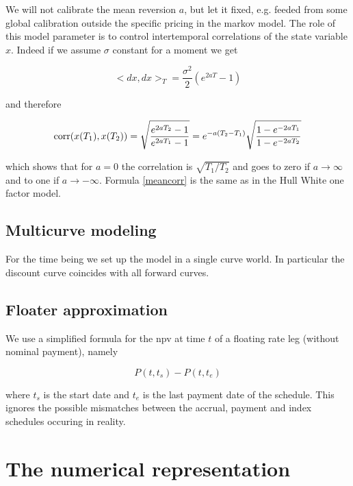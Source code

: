 \documentclass{amsart}
\theoremstyle{plain}
\numberwithin{equation}{section}
\begin{document}
We will not calibrate the mean reversion $a$, but let it fixed, e.g. feeded from some global calibration outside the specific pricing in the markov model. The role of this model parameter is to control intertemporal correlations of the state variable $x$. Indeed if we assume $\sigma$ constant for a moment we get

\begin{equation}
<dx,dx>_{T} = \frac{\sigma^2}{2}\left( e^{2aT}-1 \right)
\end{equation}

and therefore

\begin{equation}\label{meancorr}
\textnormal{corr}(x(T_1),x(T_2)) = \sqrt{{\frac{e^{2aT_2}-1}{e^{2aT_1}-1}}} = e^{-a(T_2-T_1)} \sqrt{ \frac{1-e^{-2aT_1}}{1-e^{-2aT_2}} }
\end{equation}

which shows that for $a=0$ the correlation is $\sqrt{T_1/T_2}$ and goes to zero if $a\rightarrow\infty$ and to one if $a\rightarrow -\infty$. Formula \ref{meancorr} is the same as in the Hull White one factor model.

\subsection{Multicurve modeling}

For the time being we set up the model in a single curve world. In particular the discount curve coincides with all forward curves.

\subsection{Floater approximation}

We use a simplified formula for the npv at time $t$ of a floating rate leg (without nominal payment), namely

\begin{equation}
P(t,t_s) - P(t,t_e)
\end{equation}

where $t_s$ is the start date and $t_e$ is the last payment date of the schedule. This ignores the possible mismatches between the accrual, payment and index schedules occuring in reality.

\section{The numerical representation}
\end{document}

